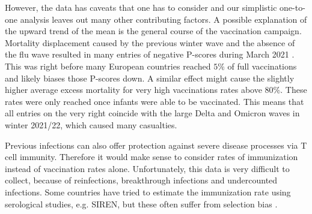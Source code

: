 \documentclass{article}
\begin{document}
However, the data has caveats that one has to consider and our simplistic one-to-one analysis leaves out many other contributing factors. A possible explanation of the upward trend of the mean is the general course of the vaccination campaign. Mortality displacement caused by the previous winter wave and the absence of the flu wave resulted in many entries of negative P-scores during March 2021 \citep{olsen20}. This was right before many European countries reached $5\%$ of full vaccinations and likely biases those P-scores down. A similar effect might cause the slightly higher average excess mortality for very high vaccinations rates above $80\%$. These rates were only reached once infants were able to be vaccinated. This means that all entries on the very right coincide with the large Delta and Omicron waves in winter 2021/22, which caused many casualties.

Previous infections can also offer protection against severe disease processes via T cell immunity. Therefore it would make sense to consider rates of immunization instead of vaccination rates alone. Unfortunately, this data is very difficult to collect, because of reinfections, breakthrough infections and undercounted infections. Some countries have tried to estimate the immunization rate using serological studies, e.g. SIREN, but these often suffer from selection bias \citep{hall21}. 
\end{document}
